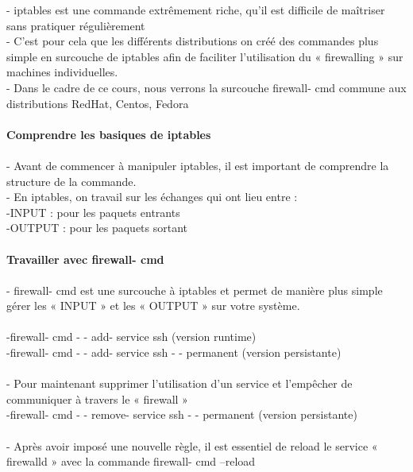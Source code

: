 \documentclass[10pt,a4paper]{article}
\begin{document}
- iptables est une commande extrêmement riche, qu’il est difficile de maîtriser sans pratiquer régulièrement \\
- C’est pour cela que les différents distributions on créé des commandes plus simple en surcouche de iptables afin de faciliter l’utilisation du « firewalling » sur machines individuelles. \\
- Dans le cadre de ce cours, nous verrons la surcouche firewall- cmd commune aux distributions RedHat, Centos, Fedora \\\\
{\large\textbf{Comprendre les basiques de iptables}}\\\\
- Avant de commencer à manipuler iptables, il est important de comprendre la structure de la commande. \\
- En iptables, on travail sur les échanges qui ont lieu entre : \\
-INPUT : pour les paquets entrants  \\
-OUTPUT : pour les paquets sortant  \\\\
{\large\textbf{Travailler avec firewall- cmd }}\\\\
- firewall- cmd est une surcouche à iptables et permet de manière plus simple gérer les « INPUT » et les « OUTPUT » sur votre système. \\\\
-firewall- cmd - - add- service ssh (version runtime)  \\
-firewall- cmd - - add- service ssh - - permanent (version persistante)  \\\\
- Pour maintenant supprimer l’utilisation d’un service et l’empêcher de communiquer à travers le « firewall » \\
-firewall- cmd - - remove- service ssh - - permanent (version persistante)  \\\\
- Après avoir imposé une nouvelle règle, il est essentiel de reload le service « firewalld » avec la commande firewall- cmd –reload\\
\end{document}
